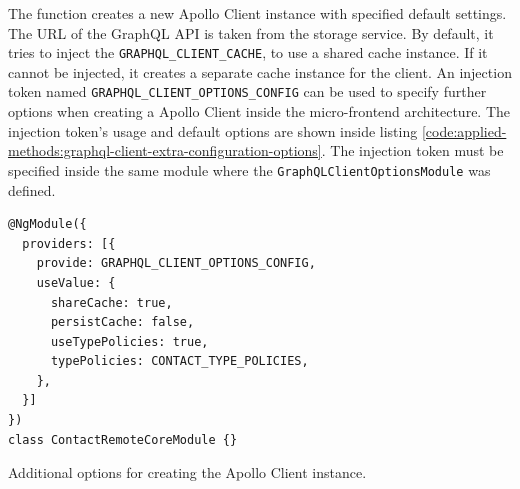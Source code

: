 \noindent The function creates a new Apollo Client instance with specified default settings. The \ac{URL} of the GraphQL \ac{API} is taken from the storage service. By default, it tries to inject the \texttt{GRAPHQL\_CLIENT\_CACHE}, to use a shared cache instance. If it cannot be injected, it creates a separate cache instance for the client. An injection token named \texttt{GRAPHQL\_CLIENT\_OPTIONS\_CONFIG} can be used to specify further options when creating a Apollo Client inside the micro-frontend architecture. The injection token's usage and default options are shown inside listing \ref{code:applied-methods:graphql-client-extra-configuration-options}. The injection token must be specified inside the same module where the \texttt{GraphQLClientOptionsModule} was defined.

\ifshowListings
\begin{listing}[H]
\begin{verbatim}
@NgModule({
  providers: [{
    provide: GRAPHQL_CLIENT_OPTIONS_CONFIG,
    useValue: {
      shareCache: true,
      persistCache: false,
      useTypePolicies: true,
      typePolicies: CONTACT_TYPE_POLICIES,
    },
  }]
})
class ContactRemoteCoreModule {}
\end{verbatim}
\caption{Additional options for creating the Apollo Client instance.}\label{code:applied-methods:graphql-client-extra-configuration-options}
\end{listing}
\fi


